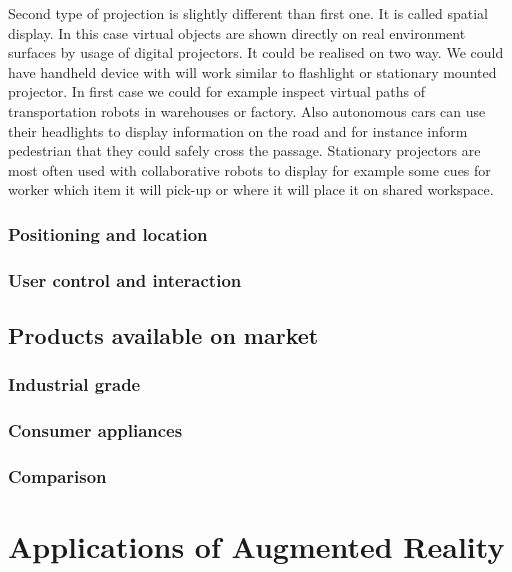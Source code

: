 \documentclass[printmode,en]{mgr}
\begin{document}
Second type of projection is slightly different than first one. It is called spatial display. In this case virtual objects are shown directly on real environment surfaces by usage of digital projectors. It could be realised on two way. We could have handheld device with will work similar to flashlight or stationary mounted projector. In first case we could for example inspect virtual paths of transportation robots in warehouses or factory. Also autonomous cars can use their headlights to display information on the road and for instance inform pedestrian that they could safely cross the passage. Stationary projectors are most often used with collaborative robots to display for example some cues for worker which item it will pick-up or where it will place it on shared workspace.

\subsection{Positioning and location}
\subsection{User control and interaction}

\section{Products available on market}

\subsection{Industrial grade}

\subsection{Consumer appliances}

\subsection{Comparison}

\chapter{Applications of Augmented Reality}
\end{document}
